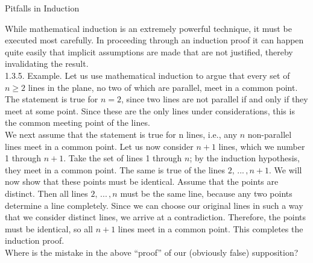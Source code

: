 \documentclass[smaller,hyperref={CJKbookmarks=true}]{beamer}
\begin{document}
\begin{frame}{Pitfalls in Induction}
\begin{spacing}{1.05}
While mathematical induction is an extremely powerful technique, it must
be executed most carefully. In proceeding through an induction proof it
can happen quite easily that implicit assumptions are made that are not
justified, thereby invalidating the result.\\[5pt]
\alert{1.3.5. Example.} Let us use mathematical induction to argue that every set of $n\geq2$ lines in the plane, no two of which are parallel, meet in a common point.\\[4pt]
The statement is true for $n = 2$, since two lines are not parallel if and only
if they meet at some point. Since these are the only lines under
considerations, this is the common meeting point of the lines.\\[4pt]
We next assume that the statement is true for n lines, i.e., any $n$
non-parallel lines meet in a common point. Let us now consider $n + 1$
lines, which we number 1 through $n +1$. Take the set of lines 1 through $n$;
by the induction hypothesis, they meet in a common point. The same is
true of the lines $2,\,...\,,n+1$. We will now show that these points must be
identical.
\newpage
Assume that the points are distinct. Then all lines $2,\,...\,,n$ must be the
same line, because any two points determine a line completely. Since we
can choose our original lines in such a way that we consider distinct lines,
we arrive at a contradiction. Therefore, the points must be identical, so all
$n + 1$ lines meet in a common point. This completes the induction proof.\\[6pt]
Where is the mistake in the above ``proof'' of our (obviously false) supposition?
\end{spacing}
\end{frame}
\end{document}
